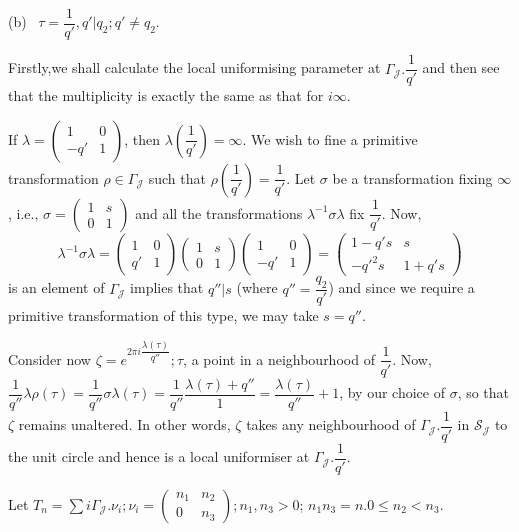 (b)~ $\tau = \dfrac{1}{q'}, q'| q_2 ; q' \neq q_2$.

Firstly,\pageoriginale we shall calculate the local uniformising parameter at
$\Gamma _\mathcal{J}. \dfrac{1}{q'}$ and then see that the
multiplicity is exactly the same as that for $i  \infty$. 

If $\lambda = \begin{pmatrix} 1 & 0 \\ -q' & 1 \end{pmatrix}$, then
$\lambda \left(\dfrac{1}{q'}\right)= \infty$. We wish to fine a primitive
transformation $\rho \in \Gamma_\mathcal{J}$ such that $\rho
(\dfrac{1}{q'})= \dfrac{1}{q'}$. Let $\sigma$ be a transformation
fixing $\infty$, i.e., $\sigma = \begin{pmatrix}1 & s \\ 0 &
  1 \end{pmatrix}$ and all the transformations $\lambda^{-1} \sigma
\lambda$ fix $\dfrac{1}{q'}$. Now,  
$$
\lambda^{-1} \sigma \lambda = \begin{pmatrix}1 & 0 \\ q' &
  1 \end{pmatrix}\begin{pmatrix}1 & s \\ 0 &
  1 \end{pmatrix} \begin{pmatrix}1 & 0 \\ -q' & 1 \end{pmatrix}
= \begin{pmatrix}1-q's & s \\ -q'^2s & 1+q's \end{pmatrix} 
$$
is an element of $\Gamma_\mathcal{J}$ implies that $q''|s$ (where $q''
= \dfrac{q_2}{q'}$) and since we require a primitive transformation of
this type, we may take $s = q''$. 

Consider now $\zeta = e^{2 \pi i \dfrac{\lambda (\tau)}{q''}}; \tau$,
a point in a neighbourhood of $\dfrac{1}{q'}$. Now, $\dfrac{1}{q''}
\lambda \rho (\tau) = \dfrac{1}{q''} \sigma \lambda (\tau) =
\dfrac{1}{q''} \dfrac{\lambda (\tau) + q''}{1}= \dfrac{ \lambda
  (\tau)}{q''}+1$, by our choice of $\sigma$, so that $\zeta$ remains
unaltered. In other words, $\zeta$ takes any neighbourhood of
$\Gamma_\mathcal{J}. \dfrac{1}{q'}$ in $\mathcal{S}_\mathcal{J}$ to
the unit circle and hence is a local uniformiser at
$\Gamma_\mathcal{J}. \dfrac{1}{q'}$.  

Let $T_n = \sum \limits{i} \Gamma_\mathcal{J}. \nu_i; \nu_i
= \begin{pmatrix} n_1 & n_2 \\ 0 & n_3 \end{pmatrix}; n_1, n_3 > 0$;
$n_1 n_3 = n. 0 \leq n_2 < n_3$. 

